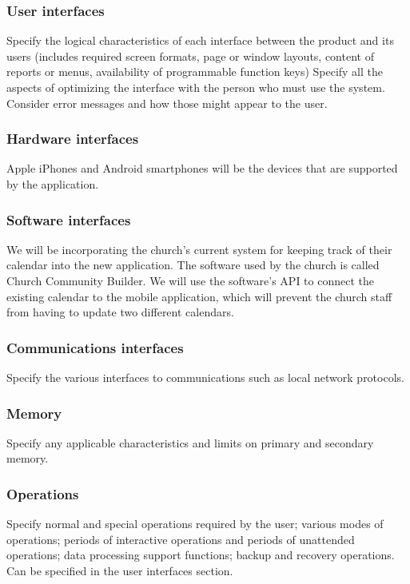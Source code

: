 \documentclass[letterpaper,10pt,draftclsnofoot,onecolumn,titlepage]{IEEEtran}
\begin{document}
	\subsubsection{User interfaces}
	Specify the logical characteristics of each interface between the product and its users (includes required screen formats, page or window layouts, content of reports or menus, availability of programmable function keys)
	Specify all the aspects of optimizing the interface with the person who must use the system. 
	Consider error messages and how those might appear to the user.
	
	\subsubsection{Hardware interfaces}
	Apple iPhones and Android smartphones will be the devices that are supported by the application. 
	
	\subsubsection{Software interfaces}
	We will be incorporating the church's current system for keeping track of their calendar into the new application. 
	The software used by the church is called Church Community Builder. 
	We will use the software's API to connect the existing calendar to the mobile application, which will prevent the church staff from having to update two different calendars. 
	
	\subsubsection{Communications interfaces}
	Specify the various interfaces to communications such as local network protocols.
	
	\subsubsection{Memory}
	Specify any applicable characteristics and limits on primary and secondary memory.
	
	\subsubsection{Operations}
	Specify normal and special operations required by the user; various modes of operations; periods of interactive operations and periods of unattended operations; data processing support functions; backup and recovery operations.
	Can be specified in the user interfaces section. 
	
\end{document}
